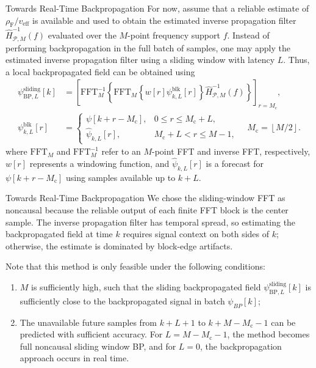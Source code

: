 \documentclass[10pt]{beamer}
\begin{document}
\begin{frame}{Towards Real-Time Backpropagation}
    For now, assume that a reliable estimate of $\rho_{\mathrm{F}} / v_{\mathrm{eff}}$ is available and used to obtain the estimated inverse propagation filter $\hat{H}_{\mathcal{P}, M}^{-1}\left(f\right)$ evaluated over the $M$-point frequency support $f$. Instead of performing backpropagation in the full batch of samples, one may apply the estimated inverse propagation filter using a sliding window with latency $L$. Thus, a local backpropagated field can be obtained using
    \begin{align}
        \label{eq:sliding_bp}
        \psi_{\mathrm{BP}, L}^{\mathrm{sliding}}\left[k\right]
        &=
        \left[
        \mathrm{FFT}_{M}^{-1}
        \left\{
        \mathrm{FFT}_{M}
        \left\{
        w\left[r\right]\psi_{k,L}^{\mathrm{blk}}\left[r\right]
        \right\}
        \hat{H}_{\mathcal{P}, M}^{-1}\left(f\right)
        \right\}
        \right]_{r=M_{\mathrm{c}}}, \\
        \psi_{k,L}^{\mathrm{blk}}\left[r\right]
        &=
        \begin{cases}
            \psi\left[k+r-M_{\mathrm{c}}\right],
            & 0 \leq r \leq M_{\mathrm{c}} + L, \\
            \widehat{\psi}_{k,L}\left[ r \right],
            & M_{\mathrm{c}} + L < r \leq M-1,
        \end{cases}
        \quad
        M_{\mathrm{c}} = \left\lfloor M/2 \right\rfloor \mathrm{.}
    \end{align}
    where $\mathrm{FFT}_{M}$ and $\mathrm{FFT}^{-1}_{M}$ refer to an $M$-point FFT and inverse FFT, respectively, $w \left[ r \right]$ represents a windowing function, and $\widehat{\psi}_{k,L}\left[r\right]$ is a forecast for $\psi\left[k+r-M_{\mathrm{c}}\right]$ using samples available up to $k+L$.
\end{frame}

\begin{frame}{Towards Real-Time Backpropagation}
    We chose the sliding-window FFT as noncausal because the reliable output of each finite FFT block is the center sample. The inverse propagation filter has temporal spread, so estimating the backpropagated field at time $k$ requires signal context on both sides of $k$; otherwise, the estimate is dominated by block-edge artifacts.

    Note that this method is only feasible under the following conditions:
    \begin{enumerate}
        \item $M$ is sufficiently high, such that the sliding backpropagated field $\psi_{\mathrm{BP}, L}^{\mathrm{sliding}}\left[k\right]$ is sufficiently close to the backpropagated signal in batch $\psi_{BP} \left[ k \right]$;
        \item The unavailable future samples from $k+L+1$ to $k+M-M_{\mathrm{c}}-1$ can be predicted with sufficient accuracy. For $L=M-M_{\mathrm{c}}-1$, the method becomes full noncausal sliding window BP, and for $L = 0$, the backpropagation approach occurs in real time.
    \end{enumerate}
\end{frame}
\end{document}
